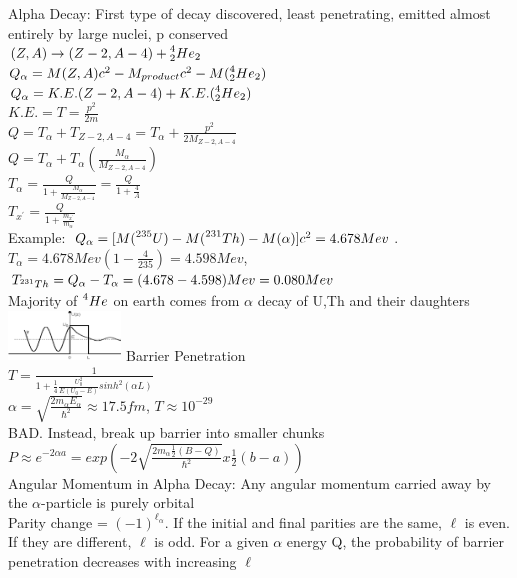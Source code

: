 \documentclass{article}
\begin{document}
\begin{multicols}{3}
Alpha Decay: First type of decay discovered, least penetrating, emitted almost entirely by large nuclei, p conserved\\
 $(Z,A)\rightarrow(Z-2,A-4) + \prescript{4}{2}{He}_{2}$\\
 $Q_{\alpha} = M(Z,A)c^{2} - M_{product}c^{2} - M(\prescript{4}{2}{He}_{2})$\\
 $Q_{\alpha} = K.E.(Z-2,A-4) + K.E.(\prescript{4}{2}{He}_{2})$\\
 $K.E. = T = \frac{p^{2}}{2m}$\\
 $Q = T_{\alpha} + T_{Z-2,A-4} = T_{\alpha} + \frac{p^2}{2M_{Z-2,A-4}}$\\
 $Q = T_{\alpha} + T_{\alpha}(\frac{M_{\alpha}}{M_{Z-2,A-4}})$\\
 $T_{\alpha} = \frac{Q}{1 + \frac{M_{\alpha}}{M_{Z-2,A-4}}} = \frac{Q}{1 + \frac{4}{A}}$\\
 $T_{x^{\prime}} = \frac{Q}{1 + \frac{m_{x^{\prime}}}{m_{\alpha}}}$\\
Example: $Q_{\alpha} = [M(\prescript{235}{}{U}) - M(\prescript{231}{}{Th}) - M(\alpha)]c^{2} = 4.678 Mev$.  $T_{\alpha} = 4.678Mev(1-\frac{4}{235}) = 4.598 Mev$, $T_{\prescript{231}{}{Th}} = Q_{\alpha} - T_{\alpha} = (4.678 - 4.598)Mev = 0.080Mev$\\
Majority of $\prescript{4}{}{He}$ on earth comes from $\alpha$ decay of U,Th and their daughters\\
\includegraphics[width=3cm]{images/alpha_barrier.png} Barrier Penetration\\
$T = \frac{1}{1 + \frac{1}{4}\frac{U_{0}^{2}}{E(U_{0}-E)}sinh^{2}(\alpha L)}$\\
$\alpha = \sqrt{\frac{2m_{\alpha}E_{\alpha}}{\hbar^{2}}} \approx 17.5 fm$,  $T\approx10^{-29}$\\
BAD.  Instead, break up barrier into smaller chunks\\
$P \approx e^{-2\alpha a} = exp(-2\sqrt{\frac{2m_{\alpha}\frac{1}{2}(B-Q)}{\hbar^{2}}}x\frac{1}{2}(b-a))$\\
Angular Momentum in Alpha Decay: Any angular momentum carried away by the $\alpha$-particle is purely orbital\\
Parity change = $(-1)^{\ell_{\alpha}}$.  If the initial and final parities are the same, $\ell$ is even.  If they are different, $\ell$ is odd.  For a given $\alpha$ energy Q, the probability of barrier penetration decreases with increasing $\ell$\\

\end{multicols}
\end{document}

